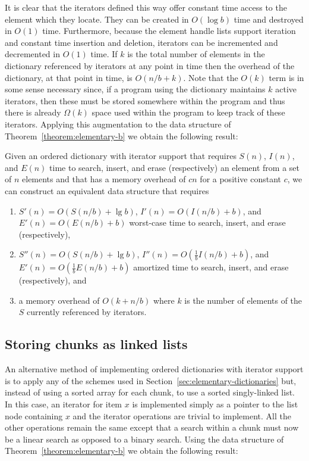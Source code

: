 \documentclass{DIKU-article}
\newcommand{\secref}[1]{\mbox{Section~\ref{sec:#1}}}
\newcommand{\thmref}[1]{Theorem~\ref{theorem:#1}}
\begin{document}
It is clear that the iterators defined this way offer constant time
access to the element which they locate.  They can be created in
$O(\log b)$ time and destroyed in $O(1)$ time.  Furthermore, because
the element handle lists support iteration and constant time insertion
and deletion, iterators can be incremented and decremented in $O(1)$
time.  If $k$ is the total number of elements in the dictionary
referenced by iterators at any point in time then the overhead of the
dictionary, at that point in time, is $O(n/b+k)$.  Note that the
$O(k)$ term is in some sense necessary since, if a program using the
dictionary maintains $k$ active iterators, then these must be stored
somewhere within the program and thus there is already $\Omega(k)$
space used within the program to keep track of these iterators.
Applying this augmentation to the data structure of
\thmref{elementary-b} we obtain the following result:

\begin{theorem}\label{theorem:iterator-a}
Given an ordered dictionary with iterator support that requires 
$S(n)$, $I(n)$, and $E(n)$
time to search, insert, and erase (respectively) an element from a
set of $n$ elements and that has a memory overhead of $cn$ for a
positive constant $c$, we can construct an equivalent data structure
that requires 
\begin{enumerate}
\item $S'(n)=O(S(n/b)+\lg b)$, $I'(n)=O(I(n/b)+b)$,
and $E'(n)=O(E(n/b)+b)$ worst-case time to search, insert,
and erase (respectively), 
\item $S''(n)=O(S(n/b)+\lg b)$,
$I''(n)=O(\frac{1}{b}I(n/b)+b)$, and
$E'(n)=O(\frac{1}{b}E(n/b)+b)$ amortized time to search,
insert, and erase (respectively), and 
\item a memory overhead of
$O(k+n/b)$ where $k$ is the number of elements of the $S$ currently 
referenced by iterators.
\end{enumerate}
\end{theorem}

\subsection{Storing chunks as linked lists}

An alternative method of implementing ordered dictionaries with
iterator support is to apply any of the schemes used in
\secref{elementary-dictionaries} but, instead of using a sorted array
for each chunk, to use a sorted singly-linked list.  In this case, an
iterator for item $x$ is implemented simply as a pointer to the list
node containing $x$ and the iterator operations are trivial to
implement.  All the other operations remain the same except that a
search within a chunk must now be a linear search as opposed to a
binary search.  Using the data structure of \thmref{elementary-b} we
obtain the following result:
\end{document}
